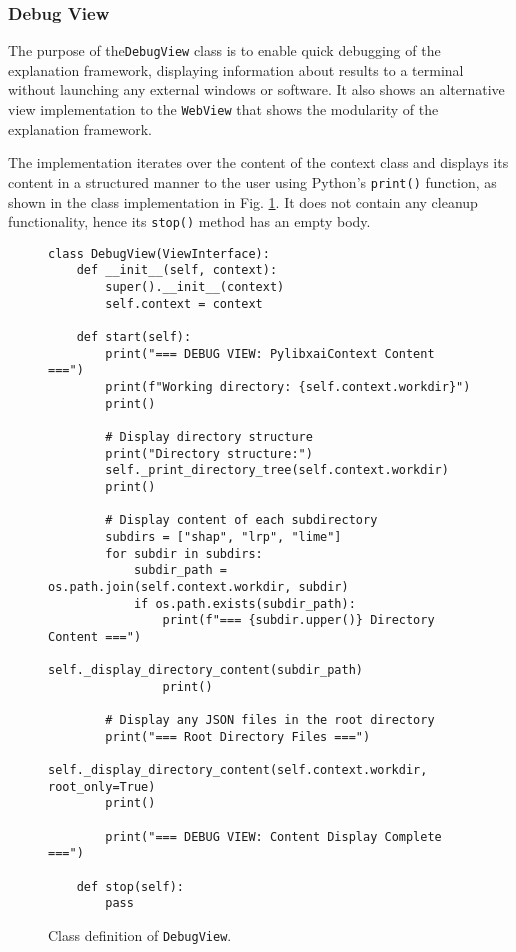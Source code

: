 \documentclass[
    bindingoffset=5mm,  %
    footnoteindent=3mm, %
    hyphenation=true    %
]{src/wut-thesis}
\begin{document}
\subsubsection{Debug View}

The purpose of the\texttt{DebugView} class is to enable quick debugging of the explanation
framework, displaying information about results to a terminal without launching any external windows or software.
It also shows an alternative view implementation to the \texttt{WebView} that shows the modularity of the explanation framework.

The implementation iterates over the content of the context class and displays its content in a structured manner to the user
using Python's \texttt{print()} function, as shown in the class implementation in Fig. \ref{fig:DebugView}. It does not contain any cleanup functionality, hence its \texttt{stop()} method has an empty body.

\begin{figure}%
\begin{verbatim}
class DebugView(ViewInterface):
    def __init__(self, context):
        super().__init__(context)
        self.context = context

    def start(self):
        print("=== DEBUG VIEW: PylibxaiContext Content ===")
        print(f"Working directory: {self.context.workdir}")
        print()
        
        # Display directory structure
        print("Directory structure:")
        self._print_directory_tree(self.context.workdir)
        print()
        
        # Display content of each subdirectory
        subdirs = ["shap", "lrp", "lime"]
        for subdir in subdirs:
            subdir_path = os.path.join(self.context.workdir, subdir)
            if os.path.exists(subdir_path):
                print(f"=== {subdir.upper()} Directory Content ===")
                self._display_directory_content(subdir_path)
                print()
        
        # Display any JSON files in the root directory
        print("=== Root Directory Files ===")
        self._display_directory_content(self.context.workdir, root_only=True)
        print()
        
        print("=== DEBUG VIEW: Content Display Complete ===")

    def stop(self):
        pass
\end{verbatim}
\caption{Class definition of \texttt{DebugView}.}
\label{fig:DebugView}
\end{figure}
\end{document}
